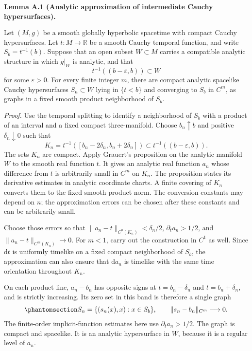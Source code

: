 \documentclass[
  english,
  11pt,
  reqno]{amsart}
\makeatletter
\newcommand{\pandocstatementheading}[1]{%
  \par\addpenalty{\@beginparpenalty}%
  \addvspace{.5\baselineskip plus .2\baselineskip minus .2\baselineskip}%
  {\normalfont\bfseries #1\par}%
  \nobreak\@afterindenttrue\@afterheading
}
\makeatother
\begin{document}
\pandocstatementheading{\protect{}\label{lem:analytic-cauchy-slice-approximation}Lemma A.1 (Analytic approximation of intermediate Cauchy hypersurfaces).}

Let \((M,g)\) be a smooth globally hyperbolic spacetime with compact
Cauchy hypersurfaces. Let \(t:M\to\mathbb R\) be a smooth Cauchy
temporal function, and write \(S_b=t^{-1}(b)\). Suppose that an open
subset \(W\subset M\) carries a compatible analytic structure in which
\(g|_W\) is analytic, and that \[
t^{-1}((b-\varepsilon,b))\subset W
\] for some \(\varepsilon>0\). For every finite integer \(m\), there are
compact analytic spacelike Cauchy hypersurfaces \(S_n\subset W\) lying
in \(\{t<b\}\) and converging to \(S_b\) in \(C^m\), as graphs in a
fixed smooth product neighborhood of \(S_b\).

\emph{Proof.} Use the temporal splitting to identify a neighborhood of
\(S_b\) with a product of an interval and a fixed compact
three-manifold. Choose \(b_n\uparrow b\) and positive
\(\delta_n\downarrow0\) such that \[
K_n=t^{-1}([b_n-2\delta_n,b_n+2\delta_n])
\subset t^{-1}((b-\varepsilon,b)).
\] The sets \(K_n\) are compact. Apply Grauert's proposition on the
analytic manifold \(W\) to the smooth real function \(t\). It gives an
analytic real function \(a_n\) whose difference from \(t\) is
arbitrarily small in \(C^m\) on \(K_n\). The proposition states its
derivative estimates in analytic coordinate charts. A finite covering of
\(K_n\) converts them to the fixed smooth product norm. The conversion
constants may depend on \(n\); the approximation errors can be chosen
after these constants and can be arbitrarily small.

Choose those errors so that \(\|a_n-t\|_{C^0(K_n)}<\delta_n/2\),
\(\partial_ta_n>1/2\), and \(\|a_n-t\|_{C^m(K_n)}\to0\). For \(m<1\),
carry out the construction in \(C^1\) as well. Since \(\mathrm dt\) is
uniformly timelike on a fixed compact neighborhood of \(S_b\), the
approximation can also ensure that \(\mathrm da_n\) is timelike with the
same time orientation throughout \(K_n\).

On each product line, \(a_n-b_n\) has opposite signs at
\(t=b_n-\delta_n\) and \(t=b_n+\delta_n\), and is strictly increasing.
Its zero set in this band is therefore a single graph
\begin{equation}\protect\phantomsection\label{eq:analytic-cauchy-slice-graphs}{
S_n=\{(s_n(x),x):x\in S_b\},
\qquad
\|s_n-b_n\|_{C^m}\longrightarrow0.
}\end{equation} The finite-order implicit-function estimates here use
\(\partial_ta_n>1/2\). The graph is compact and spacelike. It is an
analytic hypersurface in \(W\), because it is a regular level of
\(a_n\).
\end{document}
